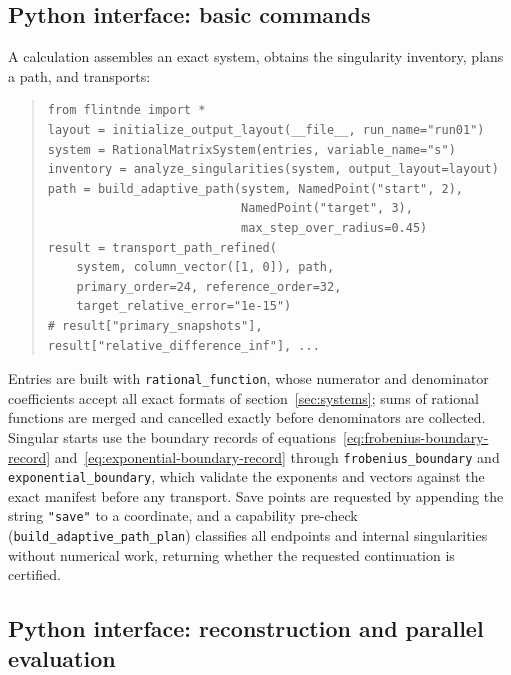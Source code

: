 \documentclass[11pt,a4paper]{article}
\begin{document}
\subsection{Python interface: basic commands}
\label{sec:python-basic}

A calculation assembles an exact system, obtains the singularity inventory, plans a path,
and transports:
\begin{quote}\small
\begin{verbatim}
from flintnde import *
layout = initialize_output_layout(__file__, run_name="run01")
system = RationalMatrixSystem(entries, variable_name="s")
inventory = analyze_singularities(system, output_layout=layout)
path = build_adaptive_path(system, NamedPoint("start", 2),
                           NamedPoint("target", 3),
                           max_step_over_radius=0.45)
result = transport_path_refined(
    system, column_vector([1, 0]), path,
    primary_order=24, reference_order=32,
    target_relative_error="1e-15")
# result["primary_snapshots"], result["relative_difference_inf"], ...
\end{verbatim}
\end{quote}
Entries are built with \texttt{rational\_function}, whose numerator and denominator
coefficients accept all exact formats of section~\ref{sec:systems}; sums of rational
functions are merged and cancelled exactly before denominators are collected. Singular
starts use the boundary records of equations~\eqref{eq:frobenius-boundary-record}
and~\eqref{eq:exponential-boundary-record} through \texttt{frobenius\_boundary} and
\texttt{exponential\_boundary}, which validate the exponents and vectors against the exact
manifest before any transport. Save points are requested by appending the string
\texttt{"save"} to a coordinate, and a capability pre-check
(\texttt{build\_adaptive\_path\_plan}) classifies all endpoints and internal singularities
without numerical work, returning whether the requested continuation is certified.

\subsection{Python interface: reconstruction and parallel evaluation}
\label{sec:python-advanced}
\end{document}
